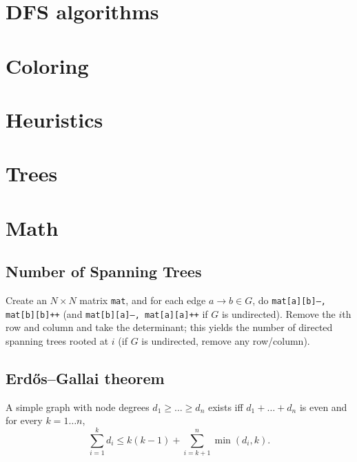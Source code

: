 \section{DFS algorithms}

\section{Coloring}

\section{Heuristics}

\section{Trees}

\section{Math}
	\subsection{Number of Spanning Trees}
		Create an $N\times N$ matrix \texttt{mat}, and for each edge $a \rightarrow b \in G$, do
		\texttt{mat[a][b]--, mat[b][b]++} (and \texttt{mat[b][a]--, mat[a][a]++} if $G$ is undirected).
		Remove the $i$th row and column and take the determinant; this yields the number of directed spanning trees rooted at $i$
		(if $G$ is undirected, remove any row/column).
	\par\vspace{12pt}
	\subsection{Erdős–Gallai theorem}
		A simple graph with node degrees $d_1 \ge \dots \ge d_n$ exists iff $d_1 + \dots + d_n$ is even and for every $k = 1\dots n$,
		\[ \sum _{i=1}^{k}d_{i}\leq k(k-1)+\sum _{i=k+1}^{n}\min(d_{i},k). \]
